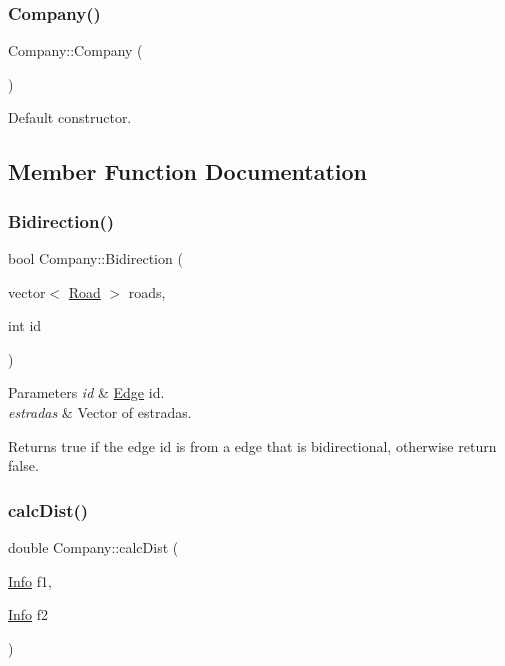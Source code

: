 \subsubsection{\texorpdfstring{Company()}{Company()}}
{\footnotesize\ttfamily Company\+::\+Company (\begin{DoxyParamCaption}{ }\end{DoxyParamCaption})}

Default constructor. 

\subsection{Member Function Documentation}
\mbox{\label{class_company_aa76aa2736a1deb9a8679804b79de6d73}} 
\subsubsection{\texorpdfstring{Bidirection()}{Bidirection()}}
{\footnotesize\ttfamily bool Company\+::\+Bidirection (\begin{DoxyParamCaption}\item[{vector$<$ \hyperlink{class_road}{Road} $>$}]{roads,  }\item[{int}]{id }\end{DoxyParamCaption})}


\begin{DoxyParams}{Parameters}
{\em id} & \hyperlink{class_edge}{Edge} id. \\
\hline
{\em estradas} & Vector of estradas.\\
\hline
\end{DoxyParams}
\begin{DoxyReturn}{Returns}
true if the edge id is from a edge that is bidirectional, otherwise return false. 
\end{DoxyReturn}
\mbox{\label{class_company_a71a2abfa49e7940f50e09659ec5ad45e}} 
\subsubsection{\texorpdfstring{calc\+Dist()}{calcDist()}}
{\footnotesize\ttfamily double Company\+::calc\+Dist (\begin{DoxyParamCaption}\item[{\hyperlink{class_info}{Info}}]{f1,  }\item[{\hyperlink{class_info}{Info}}]{f2 }\end{DoxyParamCaption})}



